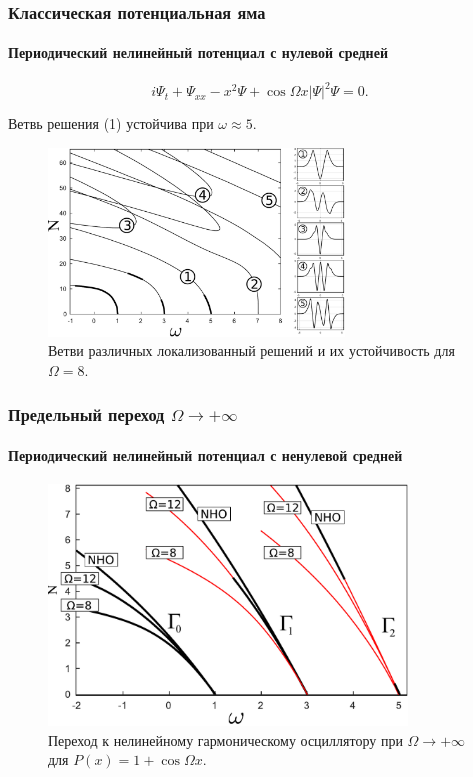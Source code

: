 \documentclass{beamer}
\begin{document}
\begin{frame}
	\frametitle{Классическая потенциальная яма}
	\framesubtitle{Периодический нелинейный потенциал с нулевой средней}
	
	\begin{equation}
		i \Psi_t + \Psi_{xx} - x^2 \Psi + \cos \Omega x |\Psi|^2 \Psi = 0.
	\end{equation}

	Ветвь решения {\color{ceruleanblue} (1)} устойчива при $\omega \approx 5$.

	\begin{figure}
		\includegraphics[width=0.7\textwidth]{pic/solution_branches_zero_mean.pdf}
		\caption{Ветви различных локализованный решений и их устойчивость для $\Omega = 8$.}
		\label{pic:branches_zero_mean}
	\end{figure}	
	
\end{frame}

\begin{frame}
	\frametitle{Предельный переход $\Omega \to +\infty$}
	\framesubtitle{Периодический нелинейный потенциал с ненулевой средней}
	
	\begin{figure}
		\includegraphics[width=0.85\textwidth]{pic/nonlinear_oscillator_limit.pdf}
		\caption{Переход к нелинейному гармоническому осциллятору при $\Omega \to +\infty$ для $P(x) = 1 + \cos \Omega x$.}
		\label{pic:nonlinear_limit}
	\end{figure}	
\end{frame}
\end{document}
